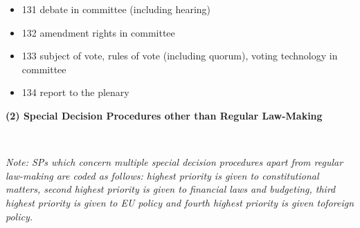 \documentclass[10pt,]{article}
\providecommand{\tightlist}{%
  \setlength{\itemsep}{0pt}\setlength{\parskip}{0pt}}
\begin{document}
\begin{itemize}
  \begin{itemize}
  \tightlist
  \item
    131 debate in committee (including hearing)
  \item
    132 amendment rights in committee
  \item
    133 subject of vote, rules of vote (including quorum), voting
    technology in committee
  \item
    134 report to the plenary
  \end{itemize}
\end{itemize}

\textbf{(2) Special Decision Procedures other than Regular Law-Making}

~

\emph{Note: SPs which concern multiple special decision procedures apart
from regular law-making are coded as follows: highest priority is given
to constitutional matters, second highest priority is given to financial
laws and budgeting, third highest priority is given to EU policy and
fourth highest priority is given toforeign policy.}
\end{document}
